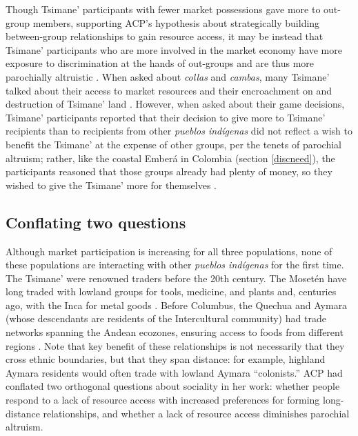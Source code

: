 \documentclass[bibauthoryear]{aa}
\begin{document}
Though Tsimane' participants with fewer market possessions gave more to out-group members, supporting ACP's hypothesis about strategically building between-group relationships to gain resource access, it may be instead that Tsimane' participants who are more involved in the market economy have more exposure to discrimination at the hands of out-groups and are thus more parochially altruistic \citep{pisor2018diversify}. When asked about \textit{collas} and \textit{cambas}, many Tsimane' talked about their access to market resources and their encroachment on and destruction of Tsimane' land \citep{pisor2018diversify}. However, when asked about their game decisions, Tsimane' participants reported that their decision to give more to Tsimane' recipients than to recipients from other \textit{pueblos ind\'igenas} did not reflect a wish to benefit the Tsimane' at the expense of other groups, per the tenets of parochial altruism; rather, like the coastal Ember\'a in Colombia (section \ref{discneed}), the participants reasoned that those groups already had plenty of money, so they wished to give the Tsimane' more for themselves \citep{Pisor2020}.
	

\subsection{Conflating two questions}\label{twoquest}

Although market participation is increasing for all three populations, none of these populations are interacting with other \textit{pueblos ind\'igenas} for the first time. The Tsimane' were renowned traders before the 20th century. The Moset\'en have long traded with lowland groups for tools, medicine, and plants \citep{lathrap1973antiquity, ringhofer2010exploring} and, centuries ago, with the Inca for metal goods \citep{godoy2015natural}. Before  Columbus, the Quechua and Aymara (whose descendants are residents of the Intercultural community) had trade networks spanning the Andean ecozones, ensuring access to foods from different regions \citep{klein2011concise}. Note that key benefit of these relationships is not necessarily that they cross ethnic boundaries, but that they span distance: for example, highland Aymara residents would often trade with lowland Aymara ``colonists.'' ACP had conflated two orthogonal questions about sociality in her work: whether people respond to a lack of resource access with increased preferences for forming long-distance   relationships, and whether a lack of resource access diminishes parochial altruism.
\end{document}
